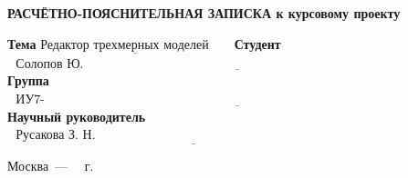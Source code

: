 \begin{titlepage}
	\begin{center}
		\Large\textbf{РАСЧЁТНО-ПОЯСНИТЕЛЬНАЯ ЗАПИСКА к курсовому проекту}
	\end{center}
	
	\noindent\textbf{Тема} $\underline{\text{Редактор трехмерных моделей~~~~~}}$\newline\newline
	\noindent\textbf{Студент} $\underline{\text{~~Солопов Ю. В.~~~~~~~~~~~~~~~~~~~~~~~~~~~~~~~~~~~~~~~~~~~~~~~~~~~~~~~~~~~~~~~~~~~~~~~~~~~~~~~~~~~~~~~}}$\newline\newline
	\noindent\textbf{Группа} $\underline{\text{~~ИУ7-56Б~~~~~~~~~~~~~~~~~~~~~~~~~~~~~~~~~~~~~~~~~~~~~~~~~~~~~~~~~~~~~~~~~~~~~~~~~~~~~~~~~~~~~~~~~~~~~~~~~}}$\newline\newline
	\noindent\textbf{Научный руководитель} $\underline{\text{~~Русакова З. Н.~~~~~~~~~~~~~~~~~~~~~~~~~~~~~~~~~~~~~~~~~~~~~~~~~~~~~~~~~~~~~~~~~~~}}$\newline
	
	\begin{center}
		\vfill
		Москва~---~\the\year
		~г.
	\end{center}
	\restoregeometry
\end{titlepage}